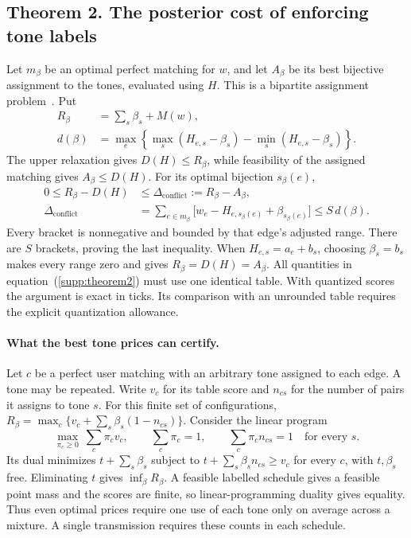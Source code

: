 \documentclass[10pt,letterpaper]{article}
\begin{document}
\subsection{Theorem 2. The posterior cost of enforcing tone labels}
Let $m_\beta$ be an optimal perfect matching for $w$, and let $A_\beta$ be its best bijective assignment to the tones, evaluated using $H$. This is a bipartite assignment problem~\cite{kuhn}. Put
\begin{equation}
 \begin{aligned}
 R_\beta&=\sum_s\beta_s+M(w),\\
 d(\beta)&=\max_e\left\{\max_s(H_{e,s}-\beta_s)
                         -\min_s(H_{e,s}-\beta_s)\right\}.
 \end{aligned}
 \label{supp:conflict-definitions}
\end{equation}
The upper relaxation gives $D(H)\le R_\beta$, while feasibility of the assigned matching gives $A_\beta\le D(H)$. For its optimal bijection $s_\beta(e)$,
\begin{equation}
 \begin{aligned}
 0\le R_\beta-D(H)&\le\Delta_{\mathrm{conflict}}:=R_\beta-A_\beta,\\
 \Delta_{\mathrm{conflict}}
 &=\sum_{e\in m_\beta}\bigl[w_e-H_{e,s_\beta(e)}+\beta_{s_\beta(e)}\bigr]
 \le S\,d(\beta).
 \end{aligned}
 \label{supp:theorem2}
\end{equation}
Every bracket is nonnegative and bounded by that edge's adjusted range. There are $S$ brackets, proving the last inequality. When $H_{e,s}=a_e+b_s$, choosing $\beta_s=b_s$ makes every range zero and gives $R_\beta=D(H)=A_\beta$. All quantities in equation~(\ref{supp:theorem2}) must use one identical table. With quantized scores the argument is exact in ticks. Its comparison with an unrounded table requires the explicit quantization allowance.

\paragraph{What the best tone prices can certify.}
Let \(c\) be a perfect user matching with an arbitrary tone assigned to each edge. A tone may be repeated. Write \(v_c\) for its table score and \(n_{cs}\) for the number of pairs it assigns to tone \(s\). For this finite set of configurations, \(R_\beta=\max_c\{v_c+\sum_s\beta_s(1-n_{cs})\}\). Consider the linear program
\[
 \max_{\pi_c\ge0}\ \sum_c\pi_c v_c,\qquad
 \sum_c\pi_c=1,\qquad \sum_c\pi_c n_{cs}=1\quad\text{for every }s .
\]
Its dual minimizes \(t+\sum_s\beta_s\) subject to \(t+\sum_s\beta_s n_{cs}\ge v_c\) for every \(c\), with \(t,\beta_s\) free. Eliminating \(t\) gives \(\inf_\beta R_\beta\). A feasible labelled schedule gives a feasible point mass and the scores are finite, so linear-programming duality gives equality. Thus even optimal prices require one use of each tone only on average across a mixture. A single transmission requires these counts in each schedule.
\end{document}
